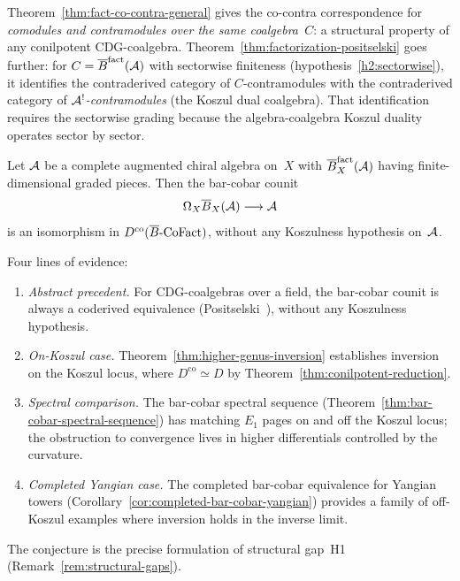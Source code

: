 \begin{remark}
\label{rem:fact-positselski-comparison}
Theorem~\ref{thm:fact-co-contra-general} gives the co-contra
correspondence for \emph{comodules and contramodules over the
same coalgebra~$C$}: a structural property of any conilpotent
CDG-coalgebra.
Theorem~\ref{thm:factorization-positselski} goes further:
for $C = \overline{B}^{\mathrm{fact}}(\mathcal{A})$ with sectorwise finiteness
(hypothesis~\ref{h2:sectorwise}), it identifies the contraderived
category of $C$-contramodules with the contraderived category of
\emph{$\mathcal{A}^!$-contramodules} (the Koszul dual coalgebra).  That
identification requires the sectorwise grading because the
algebra-coalgebra Koszul duality operates sector by sector.
\end{remark}

\begin{conjecture}
\label{conj:off-koszul-ran-inversion}
Let $\mathcal{A}$ be a complete augmented chiral algebra on~$X$ with
$\overline{B}_X^{\mathrm{fact}}(\mathcal{A})$ having finite-dimensional graded
pieces.  Then the bar-cobar counit
\[
\Omega_X \overline{B}_X(\mathcal{A}) \longrightarrow \mathcal{A}
\]
is an isomorphism in
$D^{\mathrm{co}}(\overline{B}\text{-}\mathrm{CoFact})$,
without any Koszulness hypothesis on~$\mathcal{A}$.
\end{conjecture}

\begin{remark}
\label{rem:off-koszul-evidence}
Four lines of evidence:
\begin{enumerate}[label=\textup{(\roman*)}]
\item \emph{Abstract precedent.}  For CDG-coalgebras over a
  field, the bar-cobar counit is always a coderived equivalence
  (Positselski~\cite[Theorem~7.2]{Positselski11}), without any
  Koszulness hypothesis.
\item \emph{On-Koszul case.}
  Theorem~\ref{thm:higher-genus-inversion} establishes inversion
  on the Koszul locus, where
  $D^{\mathrm{co}} \simeq D$ by
  Theorem~\ref{thm:conilpotent-reduction}.
\item \emph{Spectral comparison.}
  The bar-cobar spectral sequence
  (Theorem~\ref{thm:bar-cobar-spectral-sequence}) has matching
  $E_1$ pages on and off the Koszul locus; the obstruction to
  convergence lives in higher differentials controlled by the
  curvature.
\item \emph{Completed Yangian case.}
  The completed bar-cobar equivalence for Yangian towers
  (Corollary~\ref{cor:completed-bar-cobar-yangian}) provides
  a family of off-Koszul examples where inversion holds in the
  inverse limit.
\end{enumerate}
The conjecture is the precise formulation of structural gap~H1
(Remark~\ref{rem:structural-gaps}).
\end{remark}
